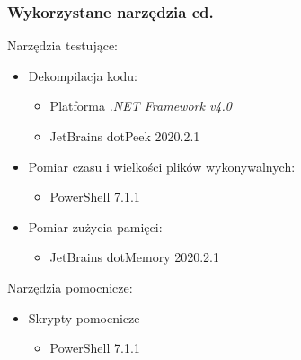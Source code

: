 \begin{frame}
  \frametitle{Wykorzystane narzędzia cd.}
  
  \begin{block}{Narzędzia testujące:}
    \begin{itemize}
      \item  Dekompilacja kodu:
      \begin{itemize}
        \item  Platforma \textit{.NET Framework v4.0}
        \item  JetBrains dotPeek 2020.2.1
      \end{itemize}
      \item  Pomiar czasu i wielkości plików wykonywalnych:
      \begin{itemize}
        \item  PowerShell 7.1.1
      \end{itemize}
      \item  Pomiar zużycia pamięci:
      \begin{itemize}
        \item  JetBrains dotMemory 2020.2.1
      \end{itemize}
    \end{itemize}
  \end{block}
  
  \begin{block}{Narzędzia pomocnicze:}
    \begin{itemize}
      \item  Skrypty pomocnicze
      \begin{itemize}
        \item  PowerShell 7.1.1
      \end{itemize}
  \end{itemize}
  \end{block}
\end{frame}

